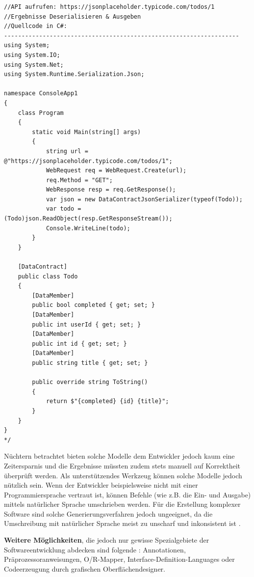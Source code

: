 \begin{lstlisting}[caption={API Aufruf und Deserialisierung aus natürlicher Sprache}, label=code:naturallangapi]
//API aufrufen: https://jsonplaceholder.typicode.com/todos/1 
//Ergebnisse Deserialisieren & Ausgeben
//Quellcode in C#:
-------------------------------------------------------------------
using System;
using System.IO;
using System.Net;
using System.Runtime.Serialization.Json;

namespace ConsoleApp1
{
	class Program
	{
		static void Main(string[] args)
		{
			string url = @"https://jsonplaceholder.typicode.com/todos/1";
			WebRequest req = WebRequest.Create(url);
			req.Method = "GET";
			WebResponse resp = req.GetResponse();
			var json = new DataContractJsonSerializer(typeof(Todo));
			var todo = (Todo)json.ReadObject(resp.GetResponseStream());
			Console.WriteLine(todo);
		}
	}
	
	[DataContract]
	public class Todo
	{
		[DataMember]
		public bool completed { get; set; }
		[DataMember]
		public int userId { get; set; }
		[DataMember]
		public int id { get; set; }
		[DataMember]
		public string title { get; set; }
		
		public override string ToString()
		{
			return $"{completed} {id} {title}";
		}
	}
}
*/
\end{lstlisting}
\FloatBarrier
Nüchtern betrachtet bieten solche Modelle dem Entwickler jedoch kaum eine Zeitersparnis und die Ergebnisse müssten zudem stets manuell auf Korrektheit überprüft werden. Als unterstützendes Werkzeug können solche Modelle jedoch nützlich sein. Wenn der Entwickler beispielsweise nicht mit einer Programmiersprache vertraut ist, können Befehle (wie z.B. die Ein- und Ausgabe) mittels natürlicher Sprache umschrieben werden. Für die Erstellung komplexer Software sind solche Generierungsverfahren jedoch ungeeignet, da die Umschreibung mit natürlicher Sprache meist zu unscharf und inkonsistent ist \cite{DBLP:journals/corr/abs-2107-03374}. 

\textbf{Weitere Möglichkeiten}, die jedoch nur gewisse Spezialgebiete der Softwareentwicklung abdecken sind folgende \cite{Dollard2008}: Annotationen, Präprozessoranweisungen, O/R-Mapper, Interface-Definition-Languages oder Codeerzeugung durch grafischen Oberflächendesigner.

